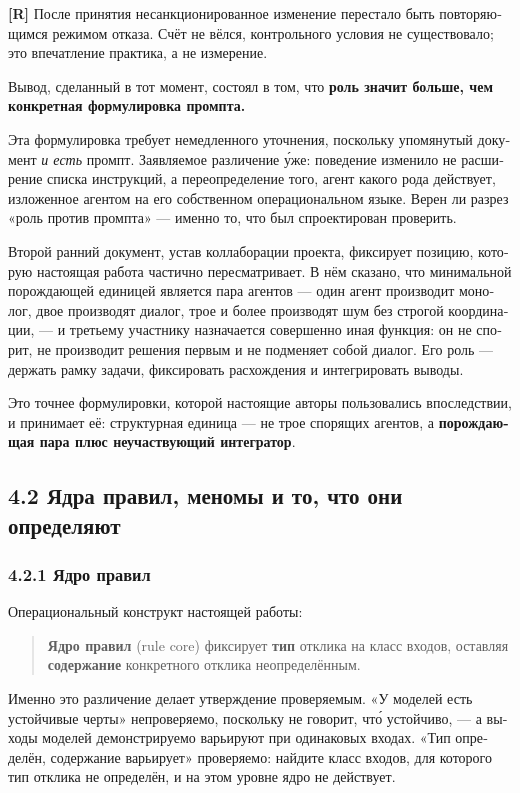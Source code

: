 \begin{russian}
\textbf{[R]} После принятия несанкционированное изменение перестало быть повторяющимся режимом отказа. Счёт не вёлся, контрольного условия не существовало; это впечатление практика, а не измерение.

Вывод, сделанный в тот момент, состоял в том, что \textbf{роль значит больше, чем конкретная формулировка промпта.}

Эта формулировка требует немедленного уточнения, поскольку упомянутый документ \emph{и есть} промпт. Заявляемое различение у́же: поведение изменило не расширение списка инструкций, а переопределение того, агент какого рода действует, изложенное агентом на его собственном операциональном языке. Верен ли разрез «роль против промпта» — именно то, что  был спроектирован проверить.

Второй ранний документ, устав коллаборации проекта, фиксирует позицию, которую настоящая работа частично пересматривает. В нём сказано, что минимальной порождающей единицей является пара агентов — один агент производит монолог, двое производят диалог, трое и более производят шум без строгой координации, — и третьему участнику назначается совершенно иная функция: он не спорит, не производит решения первым и не подменяет собой диалог. Его роль — держать рамку задачи, фиксировать расхождения и интегрировать выводы.

Это точнее формулировки, которой настоящие авторы пользовались впоследствии, и  принимает её: структурная единица — не трое спорящих агентов, а \textbf{порождающая пара плюс неучаствующий интегратор}.


\subsection*{4.2 Ядра правил, меномы и то, что они определяют}
\label{sec:ru:4.2}


\subsubsection*{4.2.1 Ядро правил}
\label{sec:ru:4.2.1}

Операциональный конструкт настоящей работы:

\begin{quote}
\textbf{Ядро правил} (rule core) фиксирует \textbf{тип} отклика на класс входов, оставляя \textbf{содержание} конкретного отклика неопределённым.
\end{quote}
Именно это различение делает утверждение проверяемым. «У моделей есть устойчивые черты» непроверяемо, поскольку не говорит, что́ устойчиво, — а выходы моделей демонстрируемо варьируют при одинаковых входах. «Тип определён, содержание варьирует» проверяемо: найдите класс входов, для которого тип отклика не определён, и на этом уровне ядро не действует.


\end{russian}
